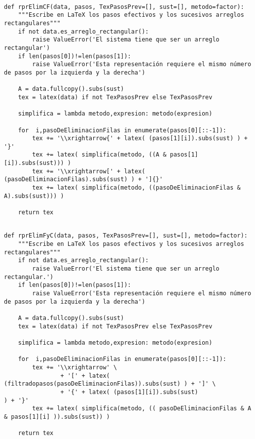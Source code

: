 \documentclass[11pt]{report}
\begin{document}
\begin{verbatim}

def rprElimCF(data, pasos, TexPasosPrev=[], sust=[], metodo=factor):
    """Escribe en LaTeX los pasos efectivos y los sucesivos arreglos rectangulares"""
    if not data.es_arreglo_rectangular():
        raise ValueError('El sistema tiene que ser un arreglo rectangular')
    if len(pasos[0])!=len(pasos[1]):
        raise ValueError('Esta representación requiere el mismo número de pasos por la izquierda y la derecha')
    
    A = data.fullcopy().subs(sust)                                                               
    tex = latex(data) if not TexPasosPrev else TexPasosPrev

    simplifica = lambda metodo,expresion: metodo(expresion)
    
    for  i,pasoDeEliminacionFilas in enumerate(pasos[0][::-1]):
        tex += '\\xrightarrow{' + latex( (pasos[1][i]).subs(sust) ) + '}'
        tex += latex( simplifica(metodo, ((A & pasos[1][i]).subs(sust))) )
        tex += '\\xrightarrow[' + latex( (pasoDeEliminacionFilas).subs(sust) ) + ']{}' 
        tex += latex( simplifica(metodo, ((pasoDeEliminacionFilas & A).subs(sust))) )
                                                               
    return tex

\end{verbatim}

\begin{verbatim}

def rprElimFyC(data, pasos, TexPasosPrev=[], sust=[], metodo=factor):
    """Escribe en LaTeX los pasos efectivos y los sucesivos arreglos rectangulares"""
    if not data.es_arreglo_rectangular():
        raise ValueError('El sistema tiene que ser un arreglo rectangular.')
    if len(pasos[0])!=len(pasos[1]):
        raise ValueError('Esta representación requiere el mismo número de pasos por la izquierda y la derecha')
    
    A = data.fullcopy().subs(sust)
    tex = latex(data) if not TexPasosPrev else TexPasosPrev

    simplifica = lambda metodo,expresion: metodo(expresion) 
    
    for  i,pasoDeEliminacionFilas in enumerate(pasos[0][::-1]):
        tex += '\\xrightarrow' \
                + '[' + latex( (filtradopasos(pasoDeEliminacionFilas)).subs(sust) ) + ']' \
                + '{' + latex( (pasos[1][i]).subs(sust)                           ) + '}'
        tex += latex( simplifica(metodo, (( pasoDeEliminacionFilas & A & pasos[1][i] )).subs(sust)) )
                                                               
    return tex

\end{verbatim}
\end{document}
